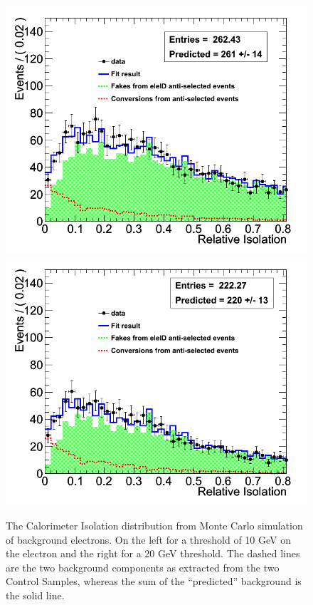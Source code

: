 \begin{figure}[h!]
\centering
\includegraphics[scale=0.28]{Plots/caloIso_pt10_fit.png}
\includegraphics[scale=0.28]{Plots/caloIso_pt20_fit.png}
\caption{The Calorimeter Isolation distribution from Monte Carlo simulation of background electrons. On the left for a threshold of 10 GeV on the electron and the right for a 20 GeV threshold.  The dashed lines are the two background components as extracted from the two Control Samples, whereas the sum of the ``predicted'' background is the solid line.}\label{fig:caloIso_fit}
\end{figure}

